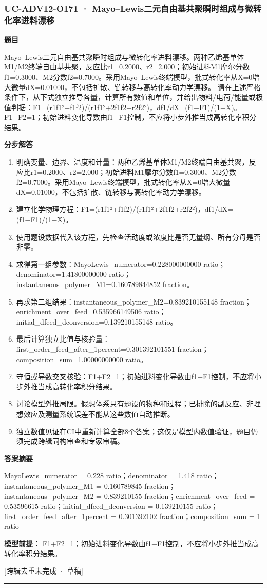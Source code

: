 \documentclass[UTF8,11pt,a4paper]{ctexart}
\begin{document}
\subsubsection*{UC-ADV12-O171 · Mayo–Lewis二元自由基共聚瞬时组成与微转化率进料漂移}
\noindent\textbf{题目}\par
Mayo–Lewis二元自由基共聚瞬时组成与微转化率进料漂移。两种乙烯基单体M1/M2终端自由基共聚，反应比r1=0.2000、r2=2.000；初始进料M1摩尔分数f1=0.3000、M2分数f2=0.7000。采用Mayo–Lewis终端模型，批式转化率从X=0增大微量dX=0.01000，不包括扩散、链转移与高转化率动力学漂移。 请在上述严格条件下，从下式独立推导各量，计算所有数值和单位，并给出物料/电荷/能量或极值判据：F1=(r1f1²+f1f2)/(r1f1²+2f1f2+r2f2²)，df1/dX=(f1−F1)/(1−X)。 F1+F2=1；初始进料变化导数由f1−F1控制，不应将小步外推当成高转化率积分结果。\par
\medskip\noindent\textbf{分步解答}
\begin{enumerate}
\item 明确变量、边界、温度和计量：两种乙烯基单体M1/M2终端自由基共聚，反应比r1=0.2000、r2=2.000；初始进料M1摩尔分数f1=0.3000、M2分数f2=0.7000。采用Mayo–Lewis终端模型，批式转化率从X=0增大微量dX=0.01000，不包括扩散、链转移与高转化率动力学漂移。
\item 建立化学物理方程：F1=(r1f1²+f1f2)/(r1f1²+2f1f2+r2f2²)，df1/dX=(f1−F1)/(1−X)。
\item 使用题设数据代入该方程，先检查活动度或浓度比是否无量纲、所有分母是否非零。
\item 求得第一组参数：MayoLewis\_numerator=0.228000000000 ratio；denominator=1.41800000000 ratio；instantaneous\_polymer\_M1=0.160789844852 fraction。
\item 再求第二组结果：instantaneous\_polymer\_M2=0.839210155148 fraction；enrichment\_over\_feed=0.535966149506 ratio；initial\_dfeed\_dconversion=0.139210155148 ratio。
\item 最后计算独立比值与核验量：first\_order\_feed\_after\_1percent=0.301392101551 fraction；composition\_sum=1.00000000000 ratio。
\item 守恒或导数交叉核验：F1+F2=1；初始进料变化导数由f1−F1控制，不应将小步外推当成高转化率积分结果。
\item 讨论模型外推局限。假想体系只有题设的物种和过程；已排除的副反应、非理想效应及测量系统误差不能从这些数值自动推断。
\item 独立数值见证在CI中重新计算全部8个答案；这仅是模型内数值验证，题目仍须完成跨辑同构审查和专家审稿。
\end{enumerate}
\noindent\textbf{答案摘要}\par
MayoLewis\_numerator = 0.228 ratio；denominator = 1.418 ratio；instantaneous\_polymer\_M1 = 0.160789845 fraction；instantaneous\_polymer\_M2 = 0.839210155 fraction；enrichment\_over\_feed = 0.53596615 ratio；initial\_dfeed\_dconversion = 0.139210155 ratio；first\_order\_feed\_after\_1percent = 0.301392102 fraction；composition\_sum = 1 ratio\par
\noindent\textbf{模型前提：}
F1+F2=1；初始进料变化导数由f1−F1控制，不应将小步外推当成高转化率积分结果。\par
\noindent\textcolor{red!65!black}{[跨辑去重未完成 · 草稿]} \par
\medskip\hrule\medskip
{}
\end{document}
